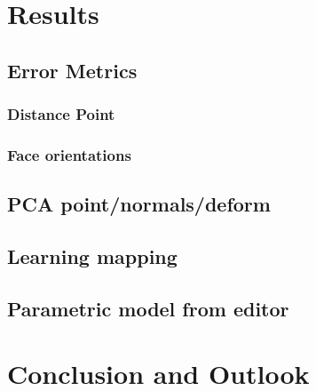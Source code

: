 \chapter{Results}

\section{Error Metrics}

\subsection{Distance Point}
\subsection{Face orientations}

\section{PCA point/normals/deform}

\section{Learning mapping}

\section{Parametric model from editor}

\chapter{Conclusion and Outlook}
